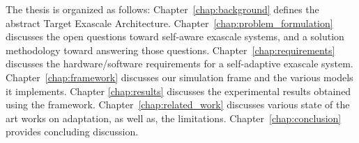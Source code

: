 The thesis is organized as follows: Chapter~\ref{chap:background} defines the abstract Target Exascale Architecture. Chapter~\ref{chap:problem_formulation} discusses the open questions toward self-aware exascale systems, and a solution methodology toward answering those questions. Chapter~\ref{chap:requirements} discusses the hardware/software requirements for a self-adaptive exascale system.  Chapter~\ref{chap:framework} discusses our simulation frame and the various models it implements. Chapter \ref{chap:results} discusses the experimental results obtained using the framework. Chapter~\ref{chap:related_work} discusses various state of the art works on adaptation, as well as, the limitations. Chapter~\ref{chap:conclusion} provides concluding discussion.

